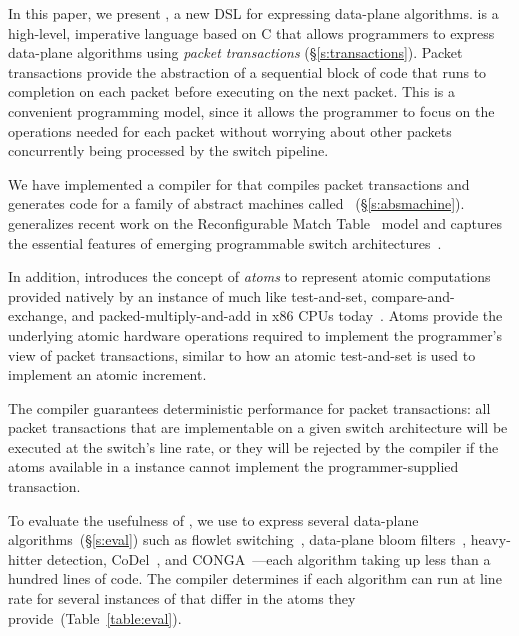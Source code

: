 In this paper, we present \pktlanguage, a new DSL for expressing data-plane
algorithms. \pktlanguage is a high-level, imperative language based on C that
allows programmers to express data-plane algorithms using {\em packet
transactions} (\S\ref{s:transactions}). Packet transactions provide the
abstraction of a sequential block of code that runs to completion on each
packet before executing on the next packet. This is a convenient programming
model, since it allows the programmer to focus on the operations needed for
each packet without worrying about other packets concurrently being processed
by the switch pipeline.

We have implemented a compiler for \pktlanguage that compiles \pktlanguage
packet transactions and generates code for a family of abstract machines called
\absmachine~(\S\ref{s:absmachine}). \absmachine generalizes recent work on the
Reconfigurable Match Table~\cite{rmt} model and captures the essential features
of emerging programmable switch architectures~\cite{rmt, xpliant, flexpipe}.

In addition, \absmachine introduces the concept of {\em atoms} to represent
atomic computations provided natively by an instance of \absmachine much like
test-and-set, compare-and-exchange, and packed-multiply-and-add in x86 CPUs
today~\cite{x86_manual}.  Atoms provide the underlying atomic hardware
operations required to implement the programmer's view of packet transactions,
similar to how an atomic test-and-set is used to implement an atomic increment.

The \pktlanguage compiler guarantees deterministic performance for packet
transactions: all packet transactions that are implementable on a given switch
architecture will be executed at the switch's line rate, or they will be
rejected by the compiler if the atoms available in a \absmachine instance cannot
implement the programmer-supplied transaction.

To evaluate the usefulness of \pktlanguage, we use \pktlanguage to express
several data-plane algorithms~(\S\ref{s:eval}) such as flowlet
switching~\cite{flowlets}, data-plane bloom filters~\cite{bloom}, heavy-hitter
detection, CoDel~\cite{codel}, and CONGA~\cite{conga}---each algorithm taking
up less than a hundred lines of \pktlanguage code.  The \pktlanguage compiler
determines if each algorithm can run at line rate for several instances of
\absmachine that differ in the atoms they provide~(Table~\ref{table:eval}).
